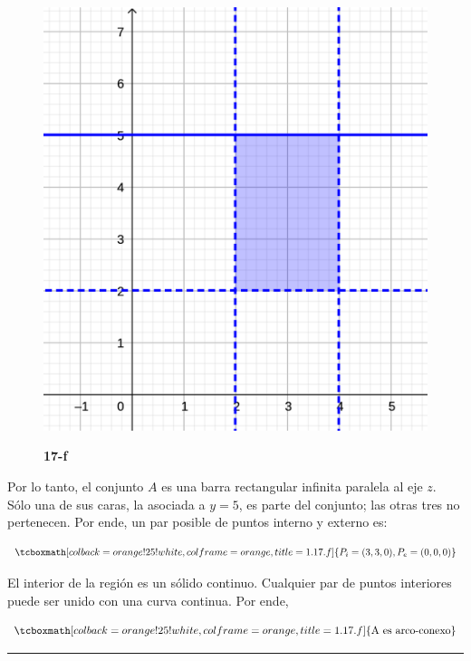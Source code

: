 \documentclass{article}
\begin{document}
\begin{figure}[ht]
\caption{\textbf{17-f}}
\includegraphics[scale=0.7]{../img/exercises/guide_01/17_f.png} 
\centering
\label{fig:1-17-f}
\end{figure}

Por lo tanto, el conjunto $A$ es una barra rectangular infinita paralela al eje $z$. Sólo una de sus caras, la asociada a $y = 5$, es parte del conjunto; las otras tres no pertenecen. Por ende, un par posible de puntos interno y externo es:

\begin{equation}
\tcboxmath[colback=orange!25!white,colframe=orange,title=1.17.f]
{
P_i = (3, 3, 0), P_e = (0, 0, 0)
}
\end{equation}

El interior de la región es un sólido continuo. Cualquier par de puntos interiores puede ser unido con una curva continua. Por ende,

\begin{equation}
\tcboxmath[colback=orange!25!white,colframe=orange,title=1.17.f]
{ \text{A es arco-conexo} }
\end{equation}

\hrule
\vspace{10 pt}
\end{document}
